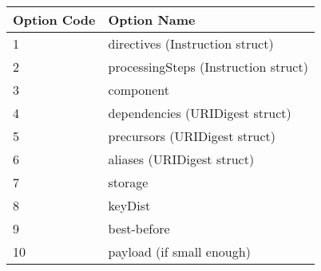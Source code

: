 \begin{longtable}[]{@{}ll@{}}
\toprule
Option Code & Option Name\tabularnewline
\midrule
\endhead
1 & directives (Instruction struct)\tabularnewline
2 & processingSteps (Instruction struct)\tabularnewline
3 & component\tabularnewline
4 & dependencies (URIDigest struct)\tabularnewline
5 & precursors (URIDigest struct)\tabularnewline
6 & aliases (URIDigest struct)\tabularnewline
7 & storage\tabularnewline
8 & keyDist\tabularnewline
9 & best-before\tabularnewline
10 & payload (if small enough)\tabularnewline
\bottomrule
\end{longtable}

